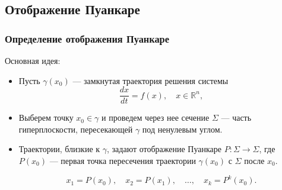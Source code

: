 	\subsection{Отображение Пуанкаре}
	
	\subsubsection{Определение отображения Пуанкаре}
	
	Основная идея:
	\begin{itemize}
		\item Пусть \(\gamma(x_0)\) — замкнутая траектория решения системы
		\begin{equation}
			\frac{dx}{dt} = f(x), \quad x \in \mathbb{R}^n,
		\end{equation}
		\item Выберем точку \(x_0 \in \gamma\) и проведем через нее сечение \(\Sigma\) — часть гиперплоскости, пересекающей \(\gamma\) под ненулевым углом.
		\item Траектории, близкие к \(\gamma\), задают отображение Пуанкаре \(P: \Sigma \to \Sigma\), где \(P(x_0)\) — первая точка пересечения траектории \(\gamma(x_0)\) с \(\Sigma\) после \(x_0\).
		
		\begin{equation}
			x_1 = P(x_0), \quad x_2 = P(x_1), \quad \dots, \quad x_k = P^k(x_0).
		\end{equation}
	\end{itemize}
	
